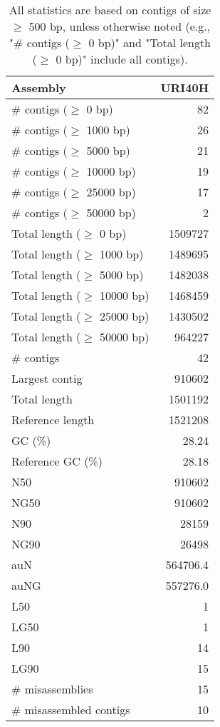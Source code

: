 \documentclass[12pt,a4paper]{article}
\begin{document}
\begin{table}[ht]
\begin{center}
\caption{All statistics are based on contigs of size $\geq$ 500 bp, unless otherwise noted (e.g., "\# contigs ($\geq$ 0 bp)" and "Total length ($\geq$ 0 bp)" include all contigs).}
\begin{tabular}{|l*{1}{|r}|}
\hline
Assembly & URI40H \\ \hline
\# contigs ($\geq$ 0 bp) & 82 \\ \hline
\# contigs ($\geq$ 1000 bp) & 26 \\ \hline
\# contigs ($\geq$ 5000 bp) & 21 \\ \hline
\# contigs ($\geq$ 10000 bp) & 19 \\ \hline
\# contigs ($\geq$ 25000 bp) & 17 \\ \hline
\# contigs ($\geq$ 50000 bp) & 2 \\ \hline
Total length ($\geq$ 0 bp) & 1509727 \\ \hline
Total length ($\geq$ 1000 bp) & 1489695 \\ \hline
Total length ($\geq$ 5000 bp) & 1482038 \\ \hline
Total length ($\geq$ 10000 bp) & 1468459 \\ \hline
Total length ($\geq$ 25000 bp) & 1430502 \\ \hline
Total length ($\geq$ 50000 bp) & 964227 \\ \hline
\# contigs & 42 \\ \hline
Largest contig & 910602 \\ \hline
Total length & 1501192 \\ \hline
Reference length & 1521208 \\ \hline
GC (\%) & 28.24 \\ \hline
Reference GC (\%) & 28.18 \\ \hline
N50 & 910602 \\ \hline
NG50 & 910602 \\ \hline
N90 & 28159 \\ \hline
NG90 & 26498 \\ \hline
auN & 564706.4 \\ \hline
auNG & 557276.0 \\ \hline
L50 & 1 \\ \hline
LG50 & 1 \\ \hline
L90 & 14 \\ \hline
LG90 & 15 \\ \hline
\# misassemblies & 15 \\ \hline
\# misassembled contigs & 10 \\ \hline

\end{tabular}
\end{center}
\end{table}
\end{document}
